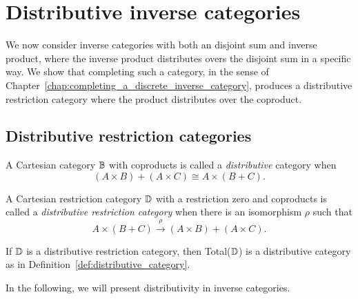 
\chapter{Distributive inverse categories} %
\label{chap:distributive_inverse_categories}
We now consider inverse categories with both an disjoint sum and
inverse product, where the inverse product distributes overs the disjoint sum in a specific way. We
show that completing such a category, in the sense of
Chapter~\ref{chap:completing_a_discrete_inverse_category}, produces a distributive restriction
category where the product distributes over the coproduct.

\section{Distributive restriction categories} %
\label{sec:distributive_restriction_categories}

\begin{definition}\label{def:distributive_category}
  A Cartesian category $\mathbb{B}$ with coproducts is called a
  \emph{distributive}\cite{cockett1993-introduction-distributive} category when
  \[
    (A\times B) + (A\times C) \cong A \times (B+ C).
  \]
\end{definition}

\begin{definition}\label{def:distributive_restriction_category}
  A Cartesian restriction category $\mathbb{D}$ with a restriction zero and coproducts is called a
  \emph{distributive restriction category}\cite{cockettlack2004:restcategories3}
  when there is an isomorphism $\rho$ such that
  \[
    A\times (B+C) \xrightarrow{\rho} (A\times B) +(A\times C).
  \]
\end{definition}

If $\mathbb{D}$ is a distributive restriction category, then Total($\mathbb{D}$) is a distributive
category as in Definition~\ref{def:distributive_category}.

In the following, we will present distributivity in inverse categories.


